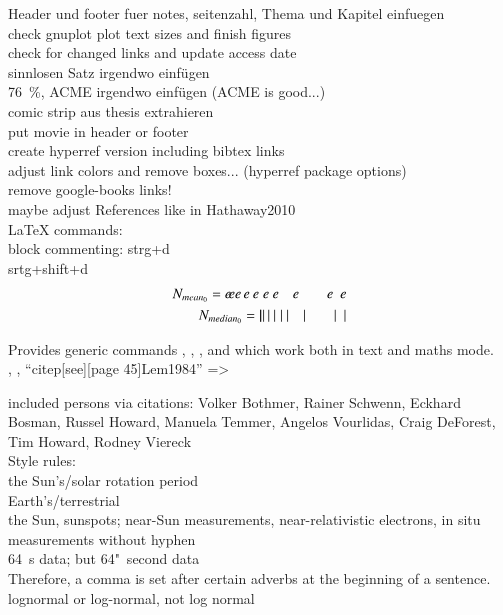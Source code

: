 	Header und footer fuer notes, seitenzahl, Thema und Kapitel einfuegen\\
	check gnuplot plot text sizes and finish figures\\
	
	check for changed links and update access date\\
	
	sinnlosen Satz irgendwo einfügen\\
	76~\%, ACME irgendwo einfügen (ACME is good...)\\
	comic strip aus thesis extrahieren\\
	put movie in header or footer\\

	create hyperref version including bibtex links\\
		adjust link colors and remove boxes... (hyperref package options)\\
		remove google-books links!\\
		maybe adjust References like in Hathaway2010\\


LaTeX commands:\\
block commenting: strg+d\\
srtg+shift+d\\

\begin{align}
	N_{mean_0} = e\!ee\,e\:e\;e\ e\quad e\qquad e\enskip e\\	%
	N_{median_0} = |\!||\,|\:|\;|\ |\quad|\qquad|\enskip|
\end{align}

Provides generic commands \degree, \celsius, \perthousand, \micro{} and \ohm{} which work both in text and maths mode.\\

\citet{Lem1984}, \citep{Lem1984}, ``citep[see][page 45]{Lem1984}'' => \citep[see][page 45]{Lem1984}

included persons via citations:
Volker Bothmer, Rainer Schwenn, Eckhard Bosman, Russel Howard, Manuela Temmer, Angelos Vourlidas, Craig DeForest, Tim Howard, Rodney Viereck\\

Style rules:\\
the Sun's/solar rotation period\\
Earth's/terrestrial\\
the Sun, sunspots; near-Sun measurements, near-relativistic electrons, in situ measurements without hyphen\\
64~s data; but 64"~second data\\
Therefore, a comma is set after certain adverbs at the beginning of a sentence.\\
lognormal or log-normal, not log normal\\

